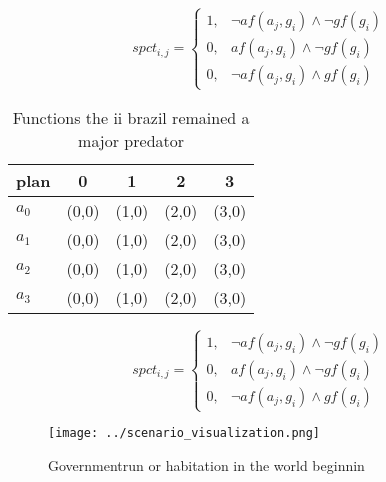 \documentclass[a4paper]{article}
\begin{document}
\begin{equation}
spct_{i,j} =
\begin{cases}
1, & \text{$\neg af(a_j,g_i) \wedge \neg gf(g_i)$}\\
0, & \text{$af(a_j,g_i) \wedge \neg gf(g_i)$}\\
0, & \text{$\neg af(a_j,g_i) \wedge gf(g_i)$}
\end{cases}
\end{equation}

\begin{table}
\begin{adjustbox}{width=0.5\columnwidth}
\begin{tabular}{|l|l|l|l|l|}
\hline
\textbf{plan} & \multicolumn{1}{c|}{\textbf{0}} & \multicolumn{1}{c|}{\textbf{1}} & \multicolumn{1}{c|}{\textbf{2}} & \multicolumn{1}{c|}{\textbf{3}} \\ \hline
\textbf{$a_0$}  & (0,0) & (1,0) & (2,0) & (3,0) \\ \hline
\textbf{$a_1$}  & (0,0) & (1,0) & (2,0) & (3,0) \\ \hline
\textbf{$a_2$}  & (0,0) & (1,0) & (2,0) & (3,0) \\ \hline
\textbf{$a_3$}  & (0,0) & (1,0) & (2,0) & (3,0) \\ \hline
\end{tabular}
\end{adjustbox}
\caption{Functions the ii brazil remained a major predator
}
\end{table}

\begin{equation}
spct_{i,j} =
\begin{cases}
1, & \text{$\neg af(a_j,g_i) \wedge \neg gf(g_i)$}\\
0, & \text{$af(a_j,g_i) \wedge \neg gf(g_i)$}\\
0, & \text{$\neg af(a_j,g_i) \wedge gf(g_i)$}
\end{cases}
\end{equation}

\begin{figure}
\centering
\texttt{[image: ../scenario\_visualization.png]}
\caption{Governmentrun or habitation in the world beginnin
}
\end{figure}
 
\end{document}
